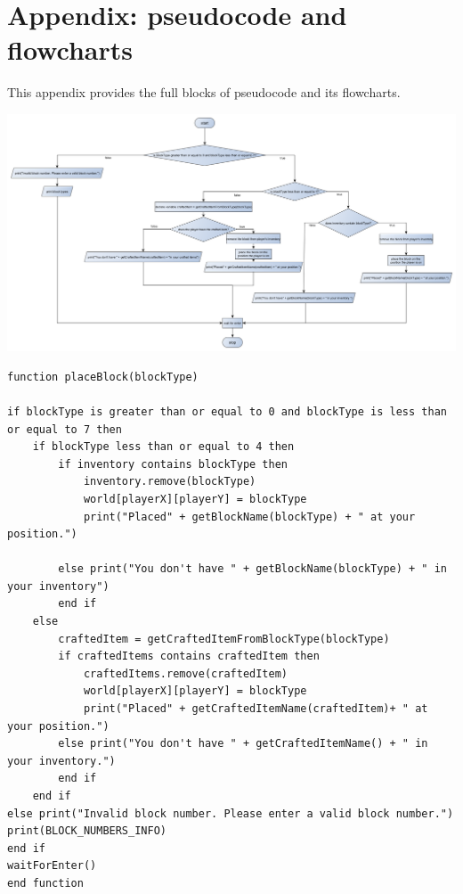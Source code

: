 \section{Appendix: pseudocode and flowcharts} \label{section: appendix}
This appendix provides the full blocks of pseudocode and its flowcharts.

{\includegraphics[width=\textwidth]{../flowchart/placeBlock.png}}

\begin{lstlisting}
function placeBlock(blockType)

if blockType is greater than or equal to 0 and blockType is less than or equal to 7 then 
	if blockType less than or equal to 4 then
		if inventory contains blockType then
			inventory.remove(blockType)
			world[playerX][playerY] = blockType
			print("Placed" + getBlockName(blockType) + " at your position.")

		else print("You don't have " + getBlockName(blockType) + " in your inventory")
		end if
	else
		craftedItem = getCraftedItemFromBlockType(blockType)
		if craftedItems contains craftedItem then 
			craftedItems.remove(craftedItem)
			world[playerX][playerY] = blockType
			print("Placed" + getCraftedItemName(craftedItem)+ " at your position.")
		else print("You don't have " + getCraftedItemName() + " in your inventory.")
		end if
	end if
else print("Invalid block number. Please enter a valid block number.")
print(BLOCK_NUMBERS_INFO)
end if
waitForEnter()
end function
\end{lstlisting}
\newpage

